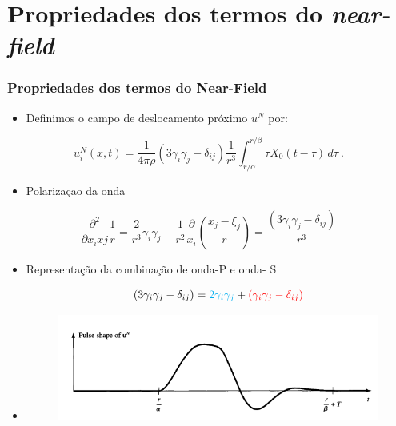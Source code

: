 \documentclass{beamer}
\begin{document}
\section{Propriedades dos termos do \textit{near-field}}
\begin{frame}
	
	\frametitle {Propriedades dos termos do Near-Field}
	
	\pause
	\begin{itemize}
		\item Definimos o campo de deslocamento próximo $u^{N}$ por:
	\end{itemize}
	
	\begin{equation}
	u_{i}^{N}(x,t)= \frac{1}{4\pi\rho}(3\gamma_{i}\gamma_{j}-\delta_{ij})\frac{1}{r^{3}} \int_{r/\alpha}^{r/\beta} \tau X_{0}(t-\tau) \,d\tau\ .
	\end{equation}
	
	\pause
	
	\begin{itemize}
		\item Polarizaçao da onda
	\end{itemize}
	\begin{center}
		\begin{equation}
		\dfrac{\partial^{2}}{\partial x_{i}x{j}}\frac{1}{r}=\frac{2}{r^{3}}\gamma_{i}\gamma_{j}-\frac{1}{r^{2}}\dfrac{\partial}{x_{i}}\left(\frac{x_{j}-\xi_{j}}{r} \right)= \frac{(3\gamma_{i}\gamma_{j}-\delta_{ij})}{r^{3}}
		\end{equation}
		
	\end{center}
	
	\begin{itemize}
		
		\pause
		\item Representação da combinação de onda-P e onda- S
		
		
		\begin{equation}
		(3\gamma_{i}\gamma_{j}-\delta_{ij})=\textcolor{cyan}{2\gamma_{i}\gamma_{j}}+ \textcolor{red}{(\gamma_{i}\gamma_{j}-\delta_{ij})}
		\end{equation}
		
	\end{itemize}
	
	\begin{itemize}
		
		\pause
		\item 
		\begin{figure}
			\includegraphics[scale=1.25]{fig1.png}
		\end{figure}
	\end{itemize}
	

\end{frame}
\end{document}
